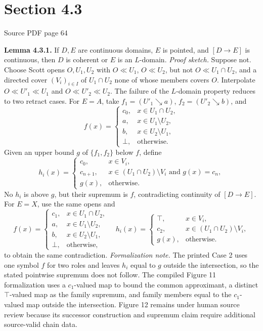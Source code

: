 \documentclass[11pt]{article}
\newcommand{\leanmarker}[2]{%
  \Needspace{3\baselineskip}%
  \marginnote{\hyperlink{#1}{\color{LeanTeal}\fbox{\scriptsize Lean}}}%
  \hypertarget{#1}{\textbf{#2.}}%
}
\newcommand{\sourcepage}[1]{\par\medskip\noindent\textcolor{SourceGray}{\scriptsize Source PDF page #1}\par\smallskip}
\begin{document}
\clearpage
\section*{Section 4.3}
\sourcepage{64}
\leanmarker{lemma-4-3-1}{Lemma 4.3.1} If $D,E$ are continuous domains, $E$ is pointed, and $[D\to E]$ is continuous, then $D$ is coherent or $E$ is an $L$-domain.
\textit{Proof sketch.} Suppose not. Choose Scott opens \(O,U_1,U_2\) with \(O\ll U_1\), \(O\ll U_2\), but not \(O\ll U_1\cap U_2\), and a directed cover \((V_i)_{i\in I}\) of \(U_1\cap U_2\) none of whose members covers \(O\). Interpolate \(O\ll U'_1\ll U_1\) and \(O\ll U'_2\ll U_2\). The failure of the \(L\)-domain property reduces to two retract cases.
For \(E=A\), take \(f_1=(U'_1\searrow a)\), \(f_2=(U'_2\searrow b)\), and
\[
 f(x)=\begin{cases}
 c_0,&x\in U_1\cap U_2,\\
 a,&x\in U_1\setminus U_2,\\
 b,&x\in U_2\setminus U_1,\\
 \bot,&\text{otherwise.}
 \end{cases}
\]
Given an upper bound \(g\) of \(\{f_1,f_2\}\) below \(f\), define
\[
 h_i(x)=\begin{cases}
 c_0,&x\in V_i,\\
 c_{n+1},&x\in (U_1\cap U_2)\setminus V_i\text{ and }g(x)=c_n,\\
 g(x),&\text{otherwise.}
 \end{cases}
\]
No \(h_i\) is above \(g\), but their supremum is \(f\), contradicting continuity of \([D\to E]\). For \(E=X\), use the same opens and
\[
 f(x)=\begin{cases}
 c_1,&x\in U_1\cap U_2,\\
 a,&x\in U_1\setminus U_2,\\
 b,&x\in U_2\setminus U_1,\\
 \bot,&\text{otherwise,}
 \end{cases}
\quad
 h_i(x)=\begin{cases}
 \top,&x\in V_i,\\
 c_2,&x\in (U_1\cap U_2)\setminus V_i,\\
 g(x),&\text{otherwise.}
 \end{cases}
\]
to obtain the same contradiction.
\textit{Formalization note.} The printed Case 2 uses one symbol \(f\) for two roles and leaves \(h_i\) equal to \(g\) outside the intersection, so the stated pointwise supremum does not follow. The compiled Figure 11 formalization uses a \(c_1\)-valued map to bound the common approximant, a distinct \(\top\)-valued map as the family supremum, and family members equal to the \(c_1\)-valued map outside the intersection. Figure 12 remains under human source review because its successor construction and supremum claim require additional source-valid chain data.
\end{document}
